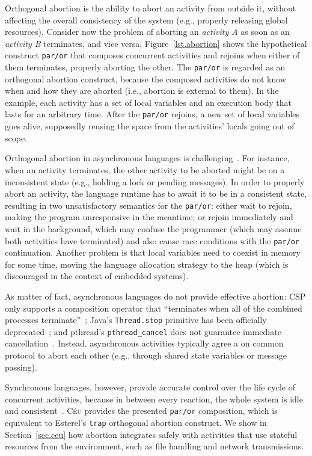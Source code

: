 \documentclass{acm_proc_article-sp}
\newcommand{\CEU}{\textsc{C\'{e}u}\xspace}
\newcommand{\code}[1] {{\small{\texttt{#1}}}}
\newcommand{\1}{\;}
\newcommand{\2}{\;\;}
\newcommand{\3}{\;\;\;}
\newcommand{\5}{\;\;\;\;\;}
\begin{document}
Orthogonal abortion is the ability to abort an activity from outside it,
without affecting the overall consistency of the system (e.g., properly 
releasing global resources).
%
Consider now the problem of aborting an \emph{activity A} as soon as an
\emph{activity B} terminates, and vice versa.
%
Figure~\ref{lst.abortion} shows the hypothetical construct \code{par/or} that 
composes concurrent activities and rejoins when either of them terminates, 
properly aborting the other.
%
The \code{par/or} is regarded as an orthogonal abortion construct, because the 
composed activities do not know when and how they are aborted (i.e., abortion 
is external to them).
%
In the example, each activity has a set of local variables and an execution 
body that lasts for an arbitrary time.
After the \code{par/or} rejoins, a new set of local variables goes alive, 
supposedly reusing the space from the activities' locals going out of scope.

Orthogonal abortion in asynchronous languages is 
challenging~\cite{esterel.preemption}.
%
For instance, when an activity terminates, the other activity to be aborted 
might be on a inconsistent state (e.g., holding a lock or pending messages).
%
In order to properly abort an activity, the language runtime has to await it to 
be in a consistent state, resulting in two unsatisfactory semantics for the 
\code{par/or}:
either wait to rejoin, making the program unresponsive in the meantime;
or rejoin immediately and wait in the background, which may confuse the 
programmer (which may assume both activities have terminated) and also cause 
race conditions with the \code{par/or} continuation.
Another problem is that local variables need to coexist in memory for some 
time, moving the language allocation strategy to the heap (which is discouraged 
in the context of embedded systems).

As matter of fact, asynchronous languages do not provide effective abortion:
CSP only supports a composition operator that ``terminates when all of the 
combined processes terminate''~\cite{async.csp};
Java's \code{Thread.stop} primitive has been officially 
deprecated~\cite{sync_async.threadsstop};
and pthread's \code{pthread\_cancel} does not guarantee immediate 
cancellation~\cite{sync_async.pthreadsstop}.
%
Instead, asynchronous activities typically agree a on common protocol to abort 
each other (e.g., through shared state variables or message passing).

Synchronous languages, however, provide accurate control over the life cycle of 
concurrent activities, because in between every reaction, the whole system is 
idle and consistent~\cite{esterel.preemption}.
%
\CEU provides the presented \code{par/or} composition, which is equivalent to 
Esterel's \code{trap} orthogonal abortion construct.
%
We show in Section~\ref{sec.ceu} how abortion integrates safely with activities 
that use stateful resources from the environment, such as file handling and 
network transmissions.
\end{document}
